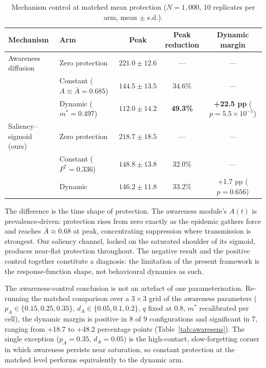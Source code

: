 \documentclass[]{interact}
\begin{document}
\begin{table}[htb]
\centering
\small
\begin{tabular}{llccc}
\hline
\textbf{Mechanism} & \textbf{Arm} & \textbf{Peak} & \textbf{Peak reduction} & \textbf{Dynamic margin} \\
\hline
Awareness diffusion & Zero protection & $221.0 \pm 12.6$ & --- & --- \\
 & Constant ($A \equiv \bar{A}{=}0.685$) & $144.5 \pm 13.5$ & $34.6\%$ & --- \\
 & Dynamic ($m^{*}{=}0.497$) & $112.0 \pm 14.2$ & \textbf{49.3\%} & \textbf{+22.5 pp} ($p{=}5.5{\times}10^{-5}$) \\
\addlinespace
Saliency--sigmoid (ours) & Zero protection & $218.7 \pm 18.5$ & --- & --- \\
 & Constant ($P^{*}{=}0.336$) & $148.8 \pm 13.8$ & $32.0\%$ & --- \\
 & Dynamic & $146.2 \pm 11.8$ & $33.2\%$ & +1.7 pp ($p{=}0.656$) \\
\hline
\end{tabular}
\caption{Mechanism control at matched mean protection ($N{=}1{,}000$, 10 replicates per arm, mean $\pm$ s.d.).}
\label{tab:mech}
\end{table}

The difference is the time shape of protection. The awareness module's $A(t)$ is prevalence-driven: protection rises from zero exactly as the epidemic gathers force and reaches $\bar{A}\approx0.68$ at peak, concentrating suppression where transmission is strongest. Our saliency channel, locked on the saturated shoulder of its sigmoid, produces near-flat protection throughout. The negative result and the positive control together constitute a diagnosis: the limitation of the present framework is the response-function shape, not behavioural dynamics as such.

The awareness-control conclusion is not an artefact of one parameterisation. Re-running the matched comparison over a $3\times3$ grid of the awareness parameters ($p_A \in \{0.15, 0.25, 0.35\}$, $d_A \in \{0.05, 0.1, 0.2\}$, $q$ fixed at 0.8, $m^{*}$ recalibrated per cell), the dynamic margin is positive in 8 of 9 configurations and significant in 7, ranging from +18.7 to +48.2 percentage points (Table~\ref{tab:awaresens}). The single exception ($p_A{=}0.35$, $d_A{=}0.05$) is the high-contact, slow-forgetting corner in which awareness persists near saturation, so constant protection at the matched level performs equivalently to the dynamic arm.
\end{document}

